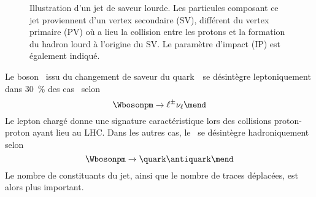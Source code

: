 \begin{figure}[h]
\centering
{}
\caption[Illustration d'un jet de saveur lourde.]{Illustration d'un jet de saveur lourde. Les particules composant ce jet proviennent d'un vertex secondaire (SV), différent du vertex primaire (PV) où a lieu la collision entre les protons et la formation du hadron lourd à l'origine du SV. Le paramètre d'impact (IP) est également indiqué.}
\label{fig-chapter-JERC-section-jets_reco-subsec-flavor-SV_scheme}
\end{figure}
\par Le boson \Wboson\ issu du changement de saveur du quark~\quarkb\ se désintègre leptoniquement dans \SI{30}{\%} des cas~\cite{PDG_booklet_2018} selon
\begin{equation}
\Wbosonpm \to \ell^\pm \nu_\ell
\mend
\end{equation}
Le lepton chargé donne une signature caractéristique lors des collisions proton-proton ayant lieu au LHC. Dans les autres cas, le \Wboson\ se désintègre hadroniquement selon
\begin{equation}
\Wbosonpm \to \quark\antiquark
\mend
\end{equation}
Le nombre de constituants du jet, ainsi que le nombre de traces déplacées, est alors plus important.
